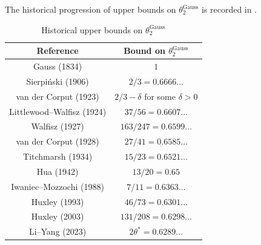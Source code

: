 The historical progression of upper bounds on $\theta_2^{\operatorname{Gauss}}$ is recorded in .


\begin{table}[ht]
    \def\arraystretch{1.2}
    \centering
    \caption{Historical upper bounds on $\theta_2^{\operatorname{Gauss}}$}
    \begin{tabular}{|c|c|}
    \hline
    Reference & Bound on $\theta_2^{\operatorname{Gauss}}$\\
    \hline
    Gauss (1834) & $1$\\
    \hline
    Sierpi\'nski (1906) \cite{sierpinski_pewnem_1906} & $2/3 = 0.6666\ldots$\\
    \hline
    van der Corput (1923) \cite{van_der_corput_neue_1923} & $2/3 - \delta$ for some $\delta > 0$\\
    \hline
    Littlewood--Walfisz (1924) \cite{littlewood_lattice_1924} & $37/56 = 0.6607\ldots$\\
    \hline
    Walfisz (1927) \cite{} & $163/247 = 0.6599\ldots$\\
    \hline
    van der Corput (1928) \cite{} & $27/41 = 0.6585\ldots$\\
    \hline
    Titchmarsh (1934) \cite{} & $15/23 = 0.6521\ldots$\\
    \hline
    Hua (1942) \cite{} & $13/20 = 0.65$\\
    \hline
    Iwaniec--Mozzochi (1988) \cite{iwaniec_divisor_1988} & $7/11 = 0.6363\ldots$ \\
    \hline
    Huxley (1993) \cite{} & $46/73 = 0.6301\ldots$\\
    \hline
    Huxley (2003) \cite{huxley_exponential_2003} & $131/208 = 0.6298\ldots$\\
    \hline
    Li--Yang (2023) \cite{li_yang_gauss_2024} & $2\theta^* = 0.6289\ldots$\\
    \hline 
    \end{tabular}
\label{gauss-circle-table-2}
\end{table}
